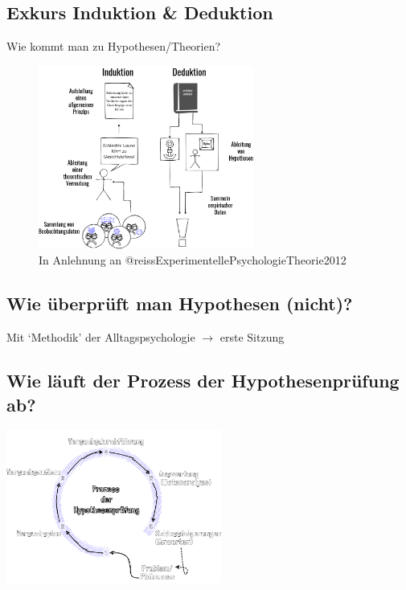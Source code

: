 \documentclass[
]{book}
\begin{document}
\hypertarget{exkurs-induktion-deduktion}{%
\subsection{Exkurs Induktion \& Deduktion}\label{exkurs-induktion-deduktion}}

Wie kommt man zu Hypothesen/Theorien?

\begin{figure}

{\centering \includegraphics[width=200pt]{imgs/InduDedu} 

}

\caption{In Anlehnung an @reissExperimentellePsychologieTheorie2012}\label{fig:unnamed-chunk-38}
\end{figure}

\hypertarget{wie-uxfcberpruxfcft-man-hypothesen-nicht}{%
\subsection{Wie überprüft man Hypothesen (nicht)?}\label{wie-uxfcberpruxfcft-man-hypothesen-nicht}}

Mit `Methodik' der Alltagspsychologie \(\rightarrow\) erste Sitzung

\hypertarget{wie-luxe4uft-der-prozess-der-hypothesenpruxfcfung-ab-1}{%
\subsection{Wie läuft der Prozess der Hypothesenprüfung ab?}\label{wie-luxe4uft-der-prozess-der-hypothesenpruxfcfung-ab-1}}

\begin{center}\includegraphics[width=200pt]{imgs/Hypothesen} \end{center}
\end{document}
